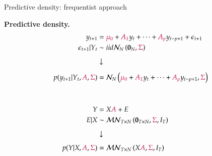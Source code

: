 \documentclass[notes,blackandwhite,mathsans,usenames,dvipsnames]{beamer}
\begin{document}
\begin{frame}{Predictive density: frequentist approach}

\textbf{Predictive density.}
\begin{align*}
y_{t+1} &= {\color{purple}\mu_0} + {\color{purple}A_1} y_{t} + \dots + {\color{purple}A_p} y_{t-p+1} + \epsilon_{t+1}\\
\epsilon_{t+1}|Y_{t} &\sim iid\mathcal{N}_N\left(\mathbf{0}_N,{\color{purple}\Sigma}\right)\\[1ex]
&\downarrow\\[1ex]
p(y_{t+1}|Y_{t},{\color{purple}A},{\color{purple}\Sigma}) &=\mathcal{N}_N\left({\color{purple}\mu_0} + {\color{purple}A_1} y_{t} + \dots + {\color{purple}A_p} y_{t-p+1},{\color{purple}\Sigma}\right)\\[6ex]
Y &= X{\color{purple}A} + E\\
E|X &\sim\mathcal{MN}_{T\times N}\left(\mathbf{0}_{T\times N},{\color{purple}\Sigma}, I_T\right)\\[1ex]
&\downarrow\\[1ex]
p(Y|X,{\color{purple}A},{\color{purple}\Sigma}) &=\mathcal{MN}_{T\times N}\left(X{\color{purple}A},{\color{purple}\Sigma}, I_T\right)
\end{align*} 

\end{frame}
\end{document}

